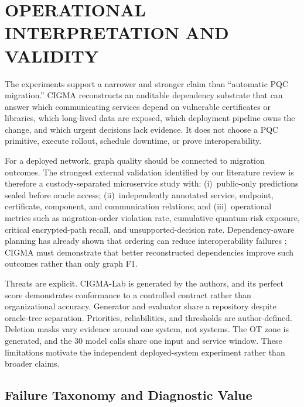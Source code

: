 \documentclass[a4paper,twoside]{article}
\newcommand{\cigma}{CIGMA\xspace}
\begin{document}
\section{\uppercase{Operational Interpretation and Validity}}
\label{sec:interpretation}

The experiments support a narrower and stronger claim than ``automatic PQC migration.'' \cigma reconstructs an auditable dependency substrate that can answer which communicating services depend on vulnerable certificates or libraries, which long-lived data are exposed, which deployment pipeline owns the change, and which urgent decisions lack evidence. It does not choose a PQC primitive, execute rollout, schedule downtime, or prove interoperability.

For a deployed network, graph quality should be connected to migration outcomes. The strongest external validation identified by our literature review is therefore a custody-separated microservice study with: (i)~public-only predictions sealed before oracle access; (ii)~independently annotated service, endpoint, certificate, component, and communication relations; and (iii)~operational metrics such as migration-order violation rate, cumulative quantum-risk exposure, critical encrypted-path recall, and unsupported-decision rate. Dependency-aware planning has already shown that ordering can reduce interoperability failures \cite{sharma2026dependency}; \cigma must demonstrate that better reconstructed dependencies improve such outcomes rather than only graph F1.

Threats are explicit. CIGMA-Lab is generated by the authors, and its perfect score demonstrates conformance to a controlled contract rather than organizational accuracy. Generator and evaluator share a repository despite oracle-tree separation. Priorities, reliabilities, and thresholds are author-defined. Deletion masks vary evidence around one system, not systems. The OT zone is generated, and the 30 model calls share one input and service window. These limitations motivate the independent deployed-system experiment rather than broader claims.

\subsection{Failure Taxonomy and Diagnostic Value}
\end{document}
